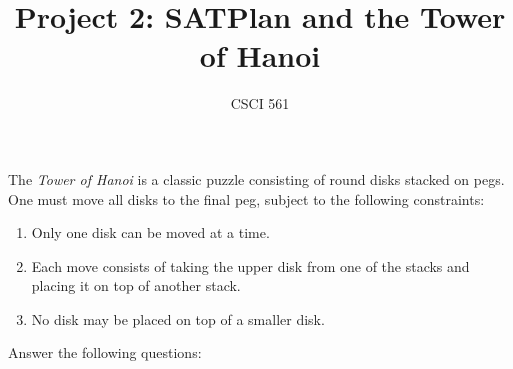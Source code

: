 \documentclass[12pt,letterpaper]{ntdhw}
\title{Project 2: SATPlan and the Tower of Hanoi}
\author{CSCI 561}
\begin{document}
\pagestyle{fancyplain}

\maketitle
\thispagestyle{fancyplain}

\begin{leftbar}
  The \emph{Tower of Hanoi} is a classic puzzle consisting of round
  disks stacked on pegs.  One must move all disks to the final peg,
  subject to the following constraints:
  \begin{enumerate}
    \item Only one disk can be moved at a time.
    \item Each move consists of taking the upper disk from one of the
    stacks and placing it on top of another stack.
    \item No disk may be placed on top of a smaller disk.
  \end{enumerate}

 \noindent Answer the following questions:
\end{leftbar}
\end{document}
